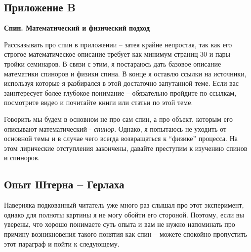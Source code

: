 \begin{center}
    \section{Приложение B}\label{appendix:B}
    \textbf{\Large{Спин. Математический и физический подход}}
\end{center}

Рассказывать про спин в приложении -- затея крайне непростая, так как его строгое математическое описание требует как минимум страниц 30 и пары-тройки семинаров. В связи с этим, я постараюсь дать базовое описание математики спиноров и физики спина. В конце я оставлю ссылки на источники, используя которые я разбирался в этой достаточно запутанной теме. Если вас заинтересует более глубокое понимание -- обязательно пройдите по ссылкам, посмотрите видео и почитайте книги или статьи по этой теме. 

Говорить мы будем в основном не про сам спин, а про объект, которым его описывают математический -  \textit{спинор}. Однако, я попытаюсь не уходить от основной темы и в случае чего всегда возвращаться к ``физике'' процесса. На этом лирические отступления закончены, давайте преступим к изучению спинов и спиноров.

\subsection{Опыт Штерна -- Герлаха}
\hspace{1em} Наверняка подкованный читатель уже много раз слышал про этот эксперимент, однако для полноты картины я не могу обойти его стороной. Поэтому, если вы уверены, что хорошо понимаете суть опыта и вам не нужно напоминать про причину возникновения такого понятия как спин -- можете спокойно пропустить этот параграф и пойти к следующему.

